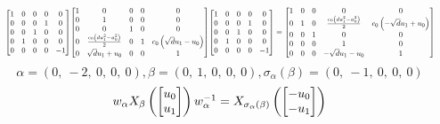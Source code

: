 \documentclass[11pt]{article}
\theoremstyle{definition}
\begin{document}
\[
\scaletoalign{\textwidth}{{\left[\begin{matrix}1 & 0 & 0 & 0 & 0\\0 & 0 & 0 & 1 & 0\\0 & 0 & 1 & 0 & 0\\0 & 1 & 0 & 0 & 0\\0 & 0 & 0 & 0 & -1\end{matrix}\right]} {\left[\begin{matrix}1 & 0 & 0 & 0 & 0\\0 & 1 & 0 & 0 & 0\\0 & 0 & 1 & 0 & 0\\0 & \frac{c_{0} \left(d u_{1}^{2} - u_{0}^{2}\right)}{2} & 0 & 1 & c_{0} \left(\sqrt{d} u_{1} - u_{0}\right)\\0 & \sqrt{d} u_{1} + u_{0} & 0 & 0 & 1\end{matrix}\right]} {\left[\begin{matrix}1 & 0 & 0 & 0 & 0\\0 & 0 & 0 & 1 & 0\\0 & 0 & 1 & 0 & 0\\0 & 1 & 0 & 0 & 0\\0 & 0 & 0 & 0 & -1\end{matrix}\right]} = {\left[\begin{matrix}1 & 0 & 0 & 0 & 0\\0 & 1 & 0 & \frac{c_{0} \left(d u_{1}^{2} - u_{0}^{2}\right)}{2} & c_{0} \left(- \sqrt{d} u_{1} + u_{0}\right)\\0 & 0 & 1 & 0 & 0\\0 & 0 & 0 & 1 & 0\\0 & 0 & 0 & - \sqrt{d} u_{1} - u_{0} & 1\end{matrix}\right]}}
\]
\[
\alpha = \left( 0, \  -2, \  0, \  0, \  0\right), \beta = \left( 0, \  1, \  0, \  0, \  0\right), \sigma_{\alpha}(\beta) = \left( 0, \  -1, \  0, \  0, \  0\right)
\]
\[
\scaletoalign{\textwidth}{w_{\alpha} X_{\beta}\left(\left[\begin{matrix}u_{0}\\u_{1}\end{matrix}\right]\right) w_{\alpha}^{-1} = X_{\sigma_{\alpha}\left(\beta\right)}\left(\left[\begin{matrix}- u_{0}\\- u_{1}\end{matrix}\right]\right)}
\]
\end{document}
